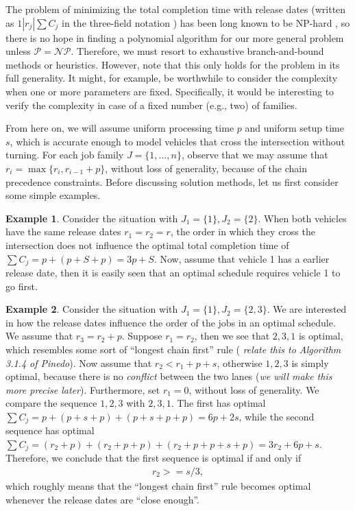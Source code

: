 \documentclass{article}
\theoremstyle{definition}
\newtheorem{eg}{Example}[section]
\begin{document}
The problem of minimizing the total completion time with release dates (written
as $1 | r_{j} | \sum C_{j}$ in the three-field notation
\cite{grahamOptimizationApproximationDeterministic1979}) has been long known to
be NP-hard \cite{lenstraComplexityMachineScheduling1977}, so there is no hope in
finding a polynomial algorithm for our more general problem unless
$\mathcal{P} = \mathcal{NP}$. Therefore, we must resort to exhaustive
branch-and-bound methods or heuristics. However, note that this only holds for
the problem in its full generality. It might, for example, be worthwhile to
consider the complexity when one or more parameters are fixed. Specifically, it
would be interesting to verify the complexity in case of a fixed number (e.g.,
two) of families.

From here on, we will assume uniform processing time $p$ and uniform setup time
$s$, which is accurate enough to model vehicles that cross the intersection
without turning. For each job family $J = \{ 1, \dots, n \}$, observe that we
may assume that $r_{i} = \max\{ r_{i}, r_{i-1} + p \}$, without loss of
generality, because of the chain precedence constraints. Before discussing
solution methods, let us first consider some simple examples.

\begin{eg}
  Consider the situation with $J_{1} = \{ 1 \}, J_{2} = \{ 2 \}$. When both
  vehicles have the same release dates $r_{1} = r_{2} = r$, the order in which
  they cross the intersection does not influence the optimal total completion
  time of $\sum C_{j} = p + (p + S + p) = 3p + S$. Now, assume that vehicle 1
  has a earlier release date, then it is easily seen that an optimal schedule
  requires vehicle 1 to go first.
\end{eg}
%
\begin{eg}
  \label{example2}
  Consider the situation with $J_{1} = \{ 1 \}, J_{2} = \{ 2, 3 \}$. We are
  interested in how the release dates influence the order of the jobs in an
  optimal schedule. We assume that $r_{3} = r_{2} + p$. Suppose $r_{1} = r_{2}$,
  then we see that $2, 3, 1$ is optimal, which resembles some sort of ``longest
  chain first'' rule (\textit{\color{blue} relate this to Algorithm 3.1.4 of
    Pinedo}). Now assume that $r_{2} < r_{1} + p + s$, otherwise $1, 2, 3$ is
  simply optimal, because there is no \textit{conflict} between the two lanes
  (\textit{\color{blue}we will make this more precise later}). Furthermore, set
  $r_{1} = 0$, without loss of generality. We compare the sequence $1, 2, 3$
  with $2, 3, 1$. The first has optimal
  $\sum C_{j} = p + (p+s+p) + (p+s+p+p) = 6p + 2s$, while the second sequence
  has optimal
  $\sum C_{j} = (r_{2} + p) + (r_{2} + p + p) + (r_{2} + p + p + s + p) = 3 r_{2} + 6p + s$.
  Therefore, we conclude that the first sequence is optimal if and only if
  \begin{align*}
    r_{2} >= s/3 ,
  \end{align*}
  which roughly means that the ``longest chain first'' rule becomes optimal
  whenever the release dates are ``close enough''.
\end{eg}
\end{document}
